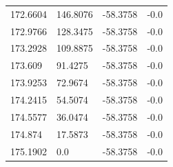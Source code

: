 \begin{table}[H]
\begin{tabular}{llll}
172.6604 & 146.8076 & -58.3758 & -0.0 \\
172.9766 & 128.3475 & -58.3758 & -0.0 \\
173.2928 & 109.8875 & -58.3758 & -0.0 \\
173.609 & 91.4275 & -58.3758 & -0.0 \\
173.9253 & 72.9674 & -58.3758 & -0.0 \\
174.2415 & 54.5074 & -58.3758 & -0.0 \\
174.5577 & 36.0474 & -58.3758 & -0.0 \\
174.874 & 17.5873 & -58.3758 & -0.0 \\
175.1902 & 0.0 & -58.3758 & -0.0 \\
\bottomrule
\end{tabular}

\end{table}
